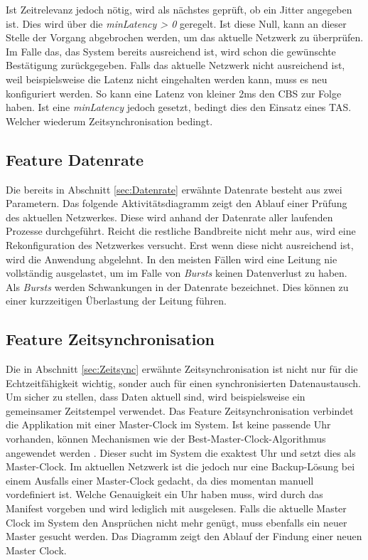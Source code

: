 Ist Zeitrelevanz jedoch nötig, wird als nächstes geprüft, ob ein Jitter angegeben ist. Dies wird über die \emph{minLatency > 0} geregelt. Ist diese Null, kann an dieser Stelle der Vorgang abgebrochen werden, um das aktuelle Netzwerk zu überprüfen. Im Falle das, das System bereits ausreichend ist, wird schon die gewünschte Bestätigung zurückgegeben. Falls das aktuelle Netzwerk nicht ausreichend ist, weil beispielsweise die Latenz nicht eingehalten werden kann, muss es neu konfiguriert werden. So kann eine Latenz von kleiner 2ms den \acl{CBS} zur Folge haben. Ist eine \emph{minLatency} jedoch gesetzt, bedingt dies den Einsatz eines \acl{TAS}. Welcher wiederum Zeitsynchronisation bedingt.
\newpage
{}

\newpage
\subsection{Feature Datenrate}
Die bereits in Abschnitt \ref{sec:Datenrate} erwähnte Datenrate besteht aus zwei Parametern. 
Das folgende Aktivitätsdiagramm zeigt den Ablauf einer Prüfung des aktuellen Netzwerkes. Diese wird anhand der Datenrate aller laufenden Prozesse durchgeführt. Reicht die restliche Bandbreite nicht mehr aus, wird eine Rekonfiguration des Netzwerkes versucht. Erst wenn diese nicht ausreichend ist, wird die Anwendung abgelehnt. In den meisten Fällen wird eine Leitung nie vollständig ausgelastet, um im Falle von \emph{Bursts} keinen Datenverlust zu haben. Als \emph{Bursts} werden Schwankungen in der Datenrate bezeichnet. Dies können zu einer kurzzeitigen Überlastung der Leitung führen.

\newpage
\subsection{Feature Zeitsynchronisation}
Die in Abschnitt \ref{sec:Zeitsync} erwähnte Zeitsynchronisation ist nicht nur für die Echtzeitfähigkeit wichtig, sonder auch für einen synchronisierten Datenaustausch. Um sicher zu stellen, dass Daten aktuell sind, wird beispielsweise ein gemeinsamer Zeitstempel verwendet. Das Feature Zeitsynchronisation verbindet die Applikation mit einer Master-Clock im System. Ist keine passende Uhr vorhanden, können Mechanismen wie der Best-Master-Clock-Algorithmus angewendet werden \cite{BestMasterClock}. Dieser sucht im System die exaktest Uhr und setzt dies als Master-Clock. Im aktuellen Netzwerk ist die jedoch nur eine Backup-Lösung bei einem Ausfalls einer Master-Clock gedacht, da dies momentan manuell vordefiniert ist. Welche Genauigkeit ein Uhr haben muss, wird durch das Manifest vorgeben und wird lediglich mit ausgelesen. Falls die aktuelle Master Clock im System den Ansprüchen nicht mehr genügt, muss ebenfalls ein neuer Master gesucht werden. Das Diagramm zeigt den Ablauf der Findung einer neuen Master Clock. 

